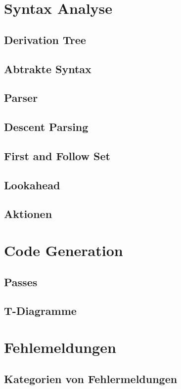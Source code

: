 \section{Syntax Analyse}
\subsection{Derivation Tree}
\subsection{Abtrakte Syntax}
\subsection{Parser}
\subsection{Descent Parsing}
\subsection{First and Follow Set}
\subsection{Lookahead}
\subsection{Aktionen}
\section{Code Generation}
\subsection{Passes}
\subsection{T-Diagramme}
\section{Fehlemeldungen}
\subsection{Kategorien von Fehlermeldungen}
